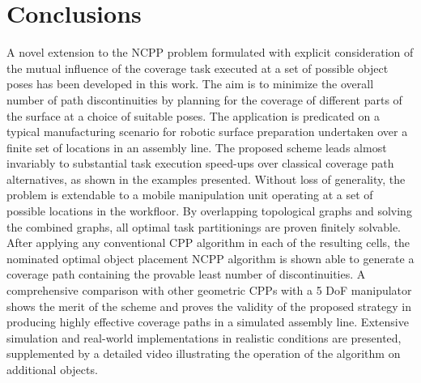 \documentclass[letterpaper,journal]{IEEEtran}
\begin{document}
\section{Conclusions}
\label{sectionconclusion}
A novel extension to the NCPP problem formulated with explicit consideration of the mutual influence of the coverage task executed at a set of possible object poses has been developed in this work. 
The aim is to minimize the overall number of path discontinuities  by planning for the coverage of different parts of the surface at a choice of suitable poses. %
The application is predicated on a typical manufacturing scenario for robotic surface preparation undertaken over a finite set of locations in an assembly line. The proposed scheme leads almost invariably to substantial task execution speed-ups over classical coverage path alternatives, as shown in the examples presented.
Without loss of generality, the problem is extendable to a mobile manipulation unit operating at a set of possible locations in the workfloor. 
By overlapping topological graphs and solving the combined graphs, all optimal task partitionings are proven finitely solvable. 
After applying any conventional CPP algorithm in each of the resulting cells, the nominated optimal object placement NCPP algorithm is shown able to generate a coverage path containing the provable least number of discontinuities. A comprehensive comparison with other geometric CPPs with a 5 DoF manipulator shows the merit of the scheme and proves the validity of the proposed strategy in producing highly effective coverage paths in a simulated assembly line.
Extensive simulation and real-world implementations in realistic conditions are presented, supplemented by a detailed video illustrating the operation of the algorithm on additional objects. 

\newpage

 



%


\end{document}
